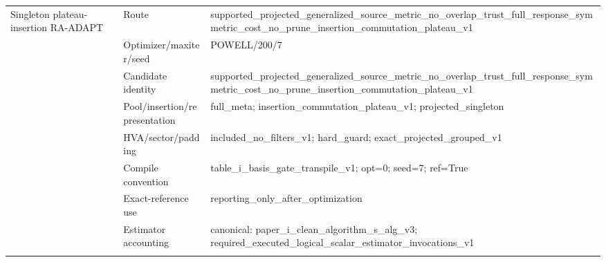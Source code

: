 \documentclass[10pt,letterpaper]{article}
\begin{document}
\begin{longtable}{@{}>{\raggedright\arraybackslash}p{0.9in}>{\raggedright\arraybackslash}p{1.65in}>{\raggedright\arraybackslash}p{4.7in}@{}}
\addlinespace[2pt]
Singleton plateau-insertion RA-ADAPT & Route & supported\_\allowbreak{}projected\_\allowbreak{}generalized\_\allowbreak{}source\_\allowbreak{}metric\_\allowbreak{}no\_\allowbreak{}overlap\_\allowbreak{}trust\_\allowbreak{}full\_\allowbreak{}response\_\allowbreak{}symmetric\_\allowbreak{}cost\_\allowbreak{}no\_\allowbreak{}prune\_\allowbreak{}insertion\_\allowbreak{}commutation\_\allowbreak{}plateau\_\allowbreak{}v1 \\
 & Optimizer/maxiter/seed & POWELL/\allowbreak{}200/\allowbreak{}7 \\
 & Candidate identity & supported\_\allowbreak{}projected\_\allowbreak{}generalized\_\allowbreak{}source\_\allowbreak{}metric\_\allowbreak{}no\_\allowbreak{}overlap\_\allowbreak{}trust\_\allowbreak{}full\_\allowbreak{}response\_\allowbreak{}symmetric\_\allowbreak{}cost\_\allowbreak{}no\_\allowbreak{}prune\_\allowbreak{}insertion\_\allowbreak{}commutation\_\allowbreak{}plateau\_\allowbreak{}v1 \\
 & Pool/insertion/representation & full\_\allowbreak{}meta;\allowbreak{} insertion\_\allowbreak{}commutation\_\allowbreak{}plateau\_\allowbreak{}v1;\allowbreak{} projected\_\allowbreak{}singleton \\
 & HVA/sector/padding & included\_\allowbreak{}no\_\allowbreak{}filters\_\allowbreak{}v1;\allowbreak{} hard\_\allowbreak{}guard;\allowbreak{} exact\_\allowbreak{}projected\_\allowbreak{}grouped\_\allowbreak{}v1 \\
 & Compile convention & table\_\allowbreak{}i\_\allowbreak{}basis\_\allowbreak{}gate\_\allowbreak{}transpile\_\allowbreak{}v1;\allowbreak{} opt=0;\allowbreak{} seed=7;\allowbreak{} ref=True \\
 & Exact-reference use & reporting\_\allowbreak{}only\_\allowbreak{}after\_\allowbreak{}optimization \\
 & Estimator accounting & canonical:\allowbreak{} paper\_\allowbreak{}i\_\allowbreak{}clean\_\allowbreak{}algorithm\_\allowbreak{}s\_\allowbreak{}alg\_\allowbreak{}v3;\allowbreak{} required\_\allowbreak{}executed\_\allowbreak{}logical\_\allowbreak{}scalar\_\allowbreak{}estimator\_\allowbreak{}invocations\_\allowbreak{}v1 \\
\addlinespace[2pt]
\bottomrule
\end{longtable}
\end{document}
